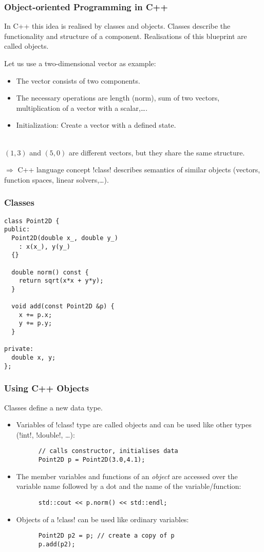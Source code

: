 \begin{frame}
\frametitle{Object-oriented Programming in C++}
In C++ this idea is realised by classes and objects. Classes describe the functionality and structure of a component. Realisations of this blueprint are called objects. 

Let us use a two-dimensional vector as example:
\begin{itemize}
\item The vector consists of two components.
\item The necessary operations are length (norm), sum of two vectors, multiplication of a vector with a scalar,\dots.
\item Initialization: Create a vector with a defined state.
\end{itemize}\ \\
$(1,3)$ and $(5,0)$ are different vectors, but they share the same structure.\\
\pause
\begin{block}{$\Rightarrow$ C++ language concept}
\inline!class! describes semantics of similar objects (vectors, function spaces, linear solvers,\dots).
\end{block}
\end{frame}

\begin{frame}[fragile]
  \frametitle{Classes}
  \begin{lstlisting}
class Point2D {
public:
  Point2D(double x_, double y_)
    : x(x_), y(y_)
  {}

  double norm() const {
    return sqrt(x*x + y*y);
  }

  void add(const Point2D &p) {
    x += p.x;
    y += p.y;
  }

private:
  double x, y;
};
  \end{lstlisting}
\end{frame}

\begin{frame}[fragile]
  \frametitle{Using C++ Objects}
 Classes define a new data type. 
\begin{itemize}
  \item Variables of \inline!class! type are called objects and can be used like other types (\inline!int!, \inline!double!, \dots):
    \begin{lstlisting}
      // calls constructor, initialises data
      Point2D p = Point2D(3.0,4.1); 
    \end{lstlisting}
  \item The member variables and functions of an \emph{object} are accessed over the variable name followed by a dot and the name of the variable/function:
    \begin{lstlisting}
      std::cout << p.norm() << std::endl;
    \end{lstlisting}
  \item Objects of a \inline!class! can be used like ordinary variables:
    \begin{lstlisting}
      Point2D p2 = p; // create a copy of p
      p.add(p2);
    \end{lstlisting}
  \end{itemize}
\end{frame}

